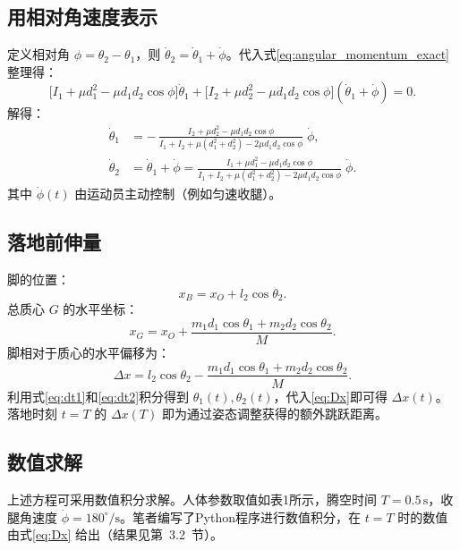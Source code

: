 \documentclass{article}
\begin{document}
\subsection{用相对角速度表示}
定义相对角 $\phi = \theta_2 - \theta_1$，则 $\dot\theta_2 = \dot\theta_1 + \dot\phi$。代入式\eqref{eq:angular_momentum_exact}整理得：
\[
\bigl[ I_1 + \mu d_1^2 - \mu d_1 d_2 \cos\phi \bigr] \dot\theta_1
+ \bigl[ I_2 + \mu d_2^2 - \mu d_1 d_2 \cos\phi \bigr] (\dot\theta_1 + \dot\phi) = 0.
\]
解得：
\begin{align}
\dot\theta_1 &= -\,\frac{I_2 + \mu d_2^2 - \mu d_1 d_2 \cos\phi}{I_1+I_2 + \mu(d_1^2+d_2^2) - 2\mu d_1 d_2 \cos\phi}\; \dot\phi, \label{eq:dt1} \\
\dot\theta_2 &= \dot\theta_1 + \dot\phi = \frac{I_1 + \mu d_1^2 - \mu d_1 d_2 \cos\phi}{I_1+I_2 + \mu(d_1^2+d_2^2) - 2\mu d_1 d_2 \cos\phi}\; \dot\phi. \label{eq:dt2}
\end{align}
其中 $\dot\phi(t)$ 由运动员主动控制（例如匀速收腿）。

\subsection{落地前伸量}
脚的位置：
\[
x_B = x_O + l_2 \cos\theta_2.
\]
总质心 $G$ 的水平坐标：
\[
x_G = x_O + \frac{m_1 d_1 \cos\theta_1 + m_2 d_2 \cos\theta_2}{M}.
\]
脚相对于质心的水平偏移为：
\[
\boxed{\Delta x = l_2\cos\theta_2 - \frac{m_1 d_1 \cos\theta_1 + m_2 d_2 \cos\theta_2}{M}}. \label{eq:Dx}
\]
利用式\eqref{eq:dt1}和\eqref{eq:dt2}积分得到 $\theta_1(t),\theta_2(t)$，代入\eqref{eq:Dx}即可得 $\Delta x(t)$。落地时刻 $t=T$ 的 $\Delta x(T)$ 即为通过姿态调整获得的额外跳跃距离。

\subsection{数值求解}
上述方程可采用数值积分求解。人体参数取值如表1所示，腾空时间 $T=0.5\,\text{s}$，收腿角速度 $\dot\phi = 180^\circ/\text{s}$。笔者编写了Python程序进行数值积分，在 $t=T$ 时的数值由式\eqref{eq:Dx} 给出（结果见第~3.2~节）。
\end{document}
